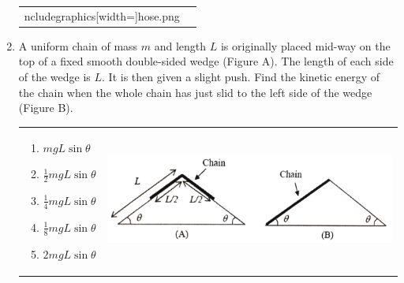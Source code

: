 \documentclass[12pt,letterpaper]{article}
\begin{document}
\begin{enumerate}
\begin{tabular}{l r}
\begin{minipage}{0.4\textwidth}
ncludegraphics[width=\textwidth]{hose.png}
\end{minipage}
\end{tabular}

\item
A uniform chain of mass $m$ and length $L$ is originally placed mid-way on the top of a fixed smooth double-sided wedge (Figure A). The length of each side of the wedge is $L$. It is then given a slight push. Find the kinetic energy of the chain when the whole chain has just slid to the left side of the wedge (Figure B).

\begin{tabular}{l r}

\begin{minipage}{0.3\textwidth}
\begin{enumerate}
\item $mgL\sin\theta$
\item $\displaystyle \frac{1}{2}mgL\sin\theta$
\item $\displaystyle \frac{1}{4}mgL\sin\theta$
\item $\displaystyle \frac{1}{8}mgL\sin\theta$
\item $2mgL\sin\theta$
\end{enumerate}
\end{minipage} &
\begin{minipage}{0.6\textwidth}
\includegraphics[width=\textwidth]{chain.png}
\end{minipage}
\end{tabular}


\end{enumerate}
\end{document}

